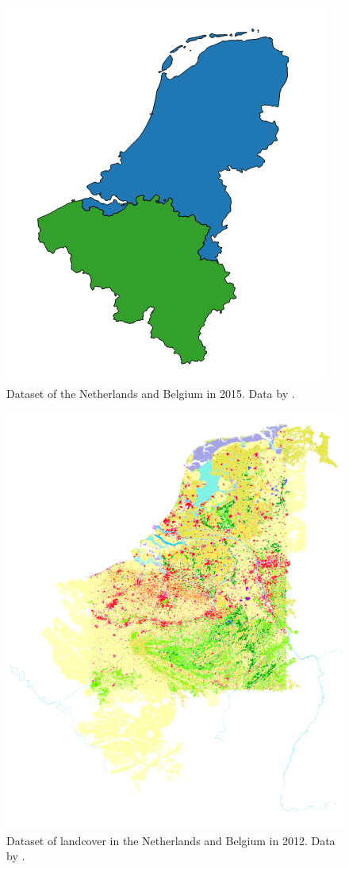 \begin{figure}[!h]
	\centering
	\includegraphics[width=0.5\linewidth]{figs/Countries.png}
	\caption{Dataset of the Netherlands and Belgium in 2015. Data by \cite{DATA:GADM}.}
	\label{fig:countries}
\end{figure}

\begin{figure}[!h]
	\centering
	\includegraphics[width=1\linewidth]{figs/CORINE_NL_BE_color.PNG}
	\caption{Dataset of landcover in the Netherlands and Belgium in 2012. Data by \cite{DATA:CLC}.}
	\label{fig:CORINE}
\end{figure}

